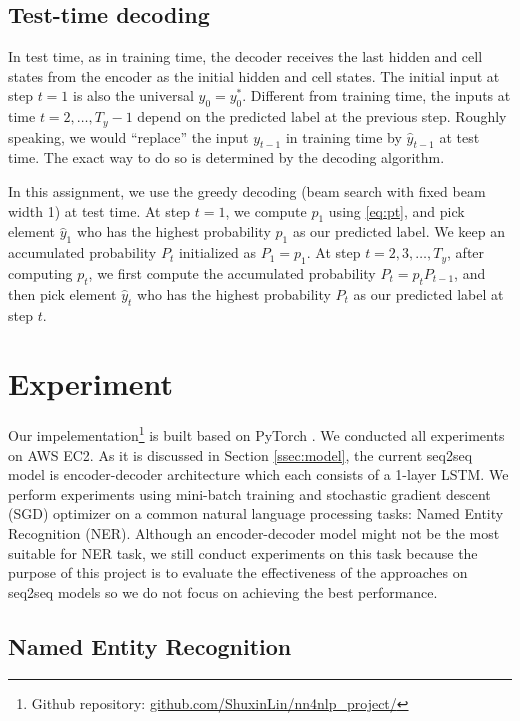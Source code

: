 \documentclass[11pt,a4paper]{article}
\begin{document}
\subsection{Test-time decoding}

In test time, as in training time, the decoder receives the last hidden and cell states from the encoder as the initial hidden and cell states. The initial input at step $t = 1$ is also the universal $y_0 = y_0^*$. Different from training time, the inputs at time $t = 2, \dots, T_y - 1$ depend on the predicted label at the previous step. Roughly speaking, we would ``replace'' the input $y_{t-1}$ in training time by $\hat{y}_{t-1}$ at test time. The exact way to do so is determined by the decoding algorithm.

In this assignment, we use the greedy decoding (beam search with fixed beam width 1) at test time. At step $t = 1$, we compute $p_1$ using \eqref{eq:pt}, and pick element $\hat{y}_1$ who has the highest probability $p_1$ as our predicted label. We keep an accumulated probability $P_t$ initialized as $P_1 = p_1$. At step $t = 2, 3, \dots, T_y$, after computing $p_t$, we first compute the accumulated probability $P_t = p_t P_{t-1}$, and then pick element $\hat{y}_t$ who has the highest probability $P_t$ as our predicted label at step $t$.



\section{Experiment}
Our impelementation\footnote{Github repository: \href{url}{github.com/ShuxinLin/nn4nlp\_project/}} is built based on PyTorch \cite{paszke2017automatic}. We conducted all experiments on AWS EC2. As it is discussed in Section \ref{ssec:model}, the current seq2seq model is encoder-decoder architecture which each consists of a 1-layer LSTM. We perform experiments using mini-batch training and stochastic gradient descent (SGD) optimizer on a common natural language processing tasks: Named Entity Recognition (NER). Although an encoder-decoder model might not be the most suitable for NER task, we still conduct experiments on this task because the purpose of this project is to evaluate the effectiveness of the approaches on seq2seq models so we do not focus on achieving the best performance. 

\subsection{Named Entity Recognition} \label{ssec:ner}
\end{document}
